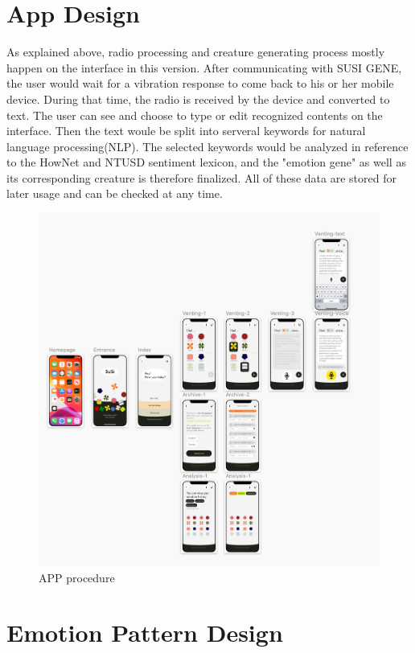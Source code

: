\documentclass[manuscript,screen]{acmart}
\begin{document}
\section{App Design}

As explained above, radio processing and creature generating process mostly happen on the interface in this version. After communicating with SUSI GENE, the user would wait for a vibration response to come back to his or her mobile device. During that time, the radio is received by the device and converted to text. The user can see and choose to type or edit recognized contents on the interface. Then the text woule be split into serveral keywords for natural language processing(NLP). The selected keywords would be analyzed in reference to the HowNet and NTUSD sentiment lexicon, and the "emotion gene" as well as its corresponding creature is therefore finalized. All of these data are stored for later usage and can be checked at any time.

\begin{figure}[h]
  \centering
  \includegraphics[width=\linewidth]{APP.png}
  \caption{APP procedure}
  \label{APP}
\end{figure}

\section{Emotion Pattern Design}
\end{document}
